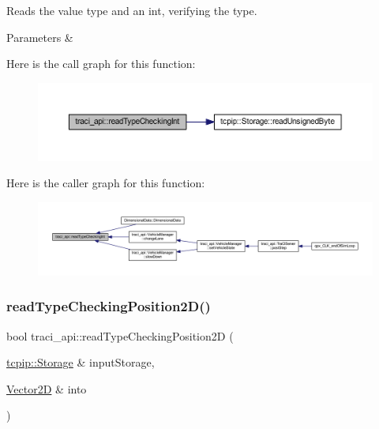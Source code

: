 Reads the value type and an int, verifying the type. 


\begin{DoxyParams}{Parameters}
{\em } & \\
\hline
\end{DoxyParams}
Here is the call graph for this function\+:
\nopagebreak
\begin{figure}[H]
\begin{center}
\leavevmode
\includegraphics[width=350pt]{namespacetraci__api_a57c1a8583619eb1e9984249249435f8e_cgraph}
\end{center}
\end{figure}
Here is the caller graph for this function\+:
\nopagebreak
\begin{figure}[H]
\begin{center}
\leavevmode
\includegraphics[width=350pt]{namespacetraci__api_a57c1a8583619eb1e9984249249435f8e_icgraph}
\end{center}
\end{figure}
\mbox{\label{namespacetraci__api_a26421201e19b2667e198708c2216ca06}} 
\subsubsection{\texorpdfstring{read\+Type\+Checking\+Position2\+D()}{readTypeCheckingPosition2D()}}
{\footnotesize\ttfamily bool traci\+\_\+api\+::read\+Type\+Checking\+Position2D (\begin{DoxyParamCaption}\item[{\hyperlink{classtcpip_1_1_storage}{tcpip\+::\+Storage} \&}]{input\+Storage,  }\item[{\hyperlink{class_vector2_d}{Vector2D} \&}]{into }\end{DoxyParamCaption})}



